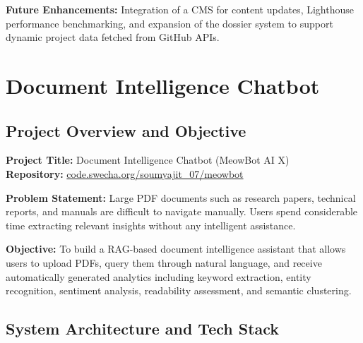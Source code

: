 \documentclass{book}
\begin{document}
\par\noindent \textbf{Future Enhancements:} Integration of a CMS for content updates, Lighthouse performance benchmarking, and expansion of the dossier system to support dynamic project data fetched from GitHub APIs.

\chapter{Document Intelligence Chatbot}

\section{Project Overview and Objective}

\par\noindent \textbf{Project Title:} Document Intelligence Chatbot (MeowBot AI X)\\
\textbf{Repository:} \href{https://code.swecha.org/soumyajit_07/meowbot}{code.swecha.org/soumyajit\_07/meowbot}

\par\noindent \textbf{Problem Statement:} Large PDF documents such as research papers, technical reports, and manuals are difficult to navigate manually. Users spend considerable time extracting relevant insights without any intelligent assistance.

\par\noindent \textbf{Objective:} To build a RAG-based document intelligence assistant that allows users to upload PDFs, query them through natural language, and receive automatically generated analytics including keyword extraction, entity recognition, sentiment analysis, readability assessment, and semantic clustering.

\section{System Architecture and Tech Stack}
\end{document}
